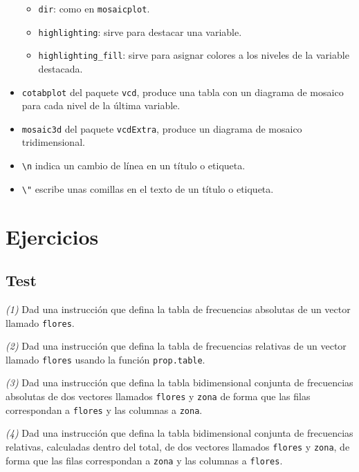 \documentclass[
]{book}
\providecommand{\tightlist}{%
  \setlength{\itemsep}{0pt}\setlength{\parskip}{0pt}}
\theoremstyle{definition}
\theoremstyle{definition}
\theoremstyle{definition}
\theoremstyle{remark}
\begin{document}
\begin{itemize}
  \begin{itemize}
  \tightlist
  \item
    \texttt{dir}: como en \texttt{mosaicplot}.
  \item
    \texttt{highlighting}: sirve para destacar una variable.
  \item
    \texttt{highlighting\_fill}: sirve para asignar colores a los niveles de la variable destacada.
  \end{itemize}
\item
  \texttt{cotabplot} del paquete \texttt{vcd}, produce una tabla con un diagrama de mosaico para cada nivel de la última variable.
\item
  \texttt{mosaic3d} del paquete \texttt{vcdExtra}, produce un diagrama de mosaico tridimensional.
\item
  \texttt{\textbackslash{}n} indica un cambio de línea en un título o etiqueta.
\item
  \texttt{\textbackslash{}"} escribe unas comillas en el texto de un título o etiqueta.
\end{itemize}

\hypertarget{ejercicios-8}{%
\section{Ejercicios}\label{ejercicios-8}}

\hypertarget{test-7}{%
\subsection*{Test}\label{test-7}}

\emph{(1)} Dad una instrucción que defina la tabla de frecuencias absolutas de un vector llamado \texttt{flores}.

\emph{(2)} Dad una instrucción que defina la tabla de frecuencias relativas de un vector llamado \texttt{flores} usando la función \texttt{prop.table}.

\emph{(3)} Dad una instrucción que defina la tabla bidimensional conjunta de frecuencias absolutas de dos vectores llamados \texttt{flores} y \texttt{zona} de forma que las filas correspondan a \texttt{flores} y las columnas a \texttt{zona}.

\emph{(4)} Dad una instrucción que defina la tabla bidimensional conjunta de frecuencias relativas, calculadas dentro del total, de dos vectores llamados \texttt{flores} y \texttt{zona}, de forma que las filas correspondan a \texttt{zona} y las columnas a \texttt{flores}.
\end{document}
